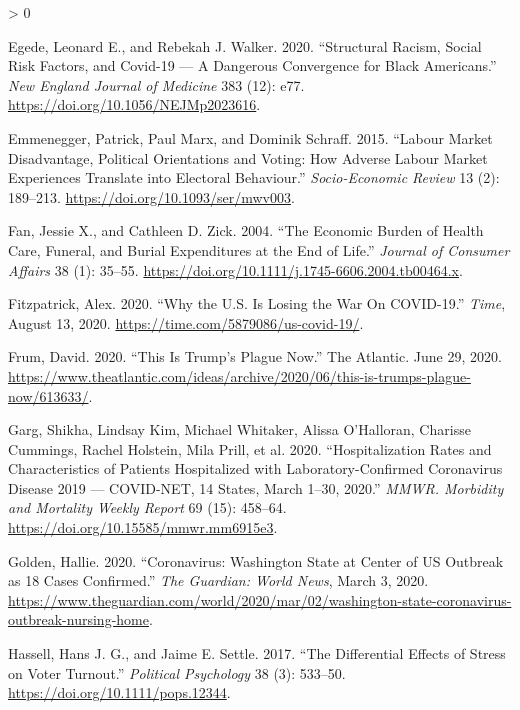 \documentclass[
  12pt,
]{article}
\newlength{\cslhangindent}
\newenvironment{CSLReferences}[2] %
 {%
  \setlength{\parindent}{0pt}
  \ifodd #1 \everypar{\setlength{\hangindent}{\cslhangindent}}\ignorespaces\fi
  \ifnum #2 > 0
  \setlength{\parskip}{#2\baselineskip}
  \fi
 }%
 {}
\begin{document}
\begin{CSLReferences}{1}{0}
\leavevmode\hypertarget{ref-Egede2020}{}%
Egede, Leonard E., and Rebekah J. Walker. 2020. {``Structural {Racism}, {Social Risk Factors}, and {Covid}-19 --- {A Dangerous Convergence} for {Black Americans}.''} \emph{New England Journal of Medicine} 383 (12): e77. \url{https://doi.org/10.1056/NEJMp2023616}.

\leavevmode\hypertarget{ref-Emmenegger2015}{}%
Emmenegger, Patrick, Paul Marx, and Dominik Schraff. 2015. {``Labour Market Disadvantage, Political Orientations and Voting: How Adverse Labour Market Experiences Translate into Electoral Behaviour.''} \emph{Socio-Economic Review} 13 (2): 189--213. \url{https://doi.org/10.1093/ser/mwv003}.

\leavevmode\hypertarget{ref-Fan2004}{}%
Fan, Jessie X., and Cathleen D. Zick. 2004. {``The {Economic Burden} of {Health Care}, {Funeral}, and {Burial Expenditures} at the {End} of {Life}.''} \emph{Journal of Consumer Affairs} 38 (1): 35--55. \url{https://doi.org/10.1111/j.1745-6606.2004.tb00464.x}.

\leavevmode\hypertarget{ref-Fitzpatrick2020}{}%
Fitzpatrick, Alex. 2020. {``Why the {U}.{S}. {Is Losing} the {War On COVID}-19.''} \emph{Time}, August 13, 2020. \url{https://time.com/5879086/us-covid-19/}.

\leavevmode\hypertarget{ref-Frum2020}{}%
Frum, David. 2020. {``This {Is Trump}'s {Plague Now}.''} {The Atlantic}. June 29, 2020. \url{https://www.theatlantic.com/ideas/archive/2020/06/this-is-trumps-plague-now/613633/}.

\leavevmode\hypertarget{ref-Garg2020}{}%
Garg, Shikha, Lindsay Kim, Michael Whitaker, Alissa O'Halloran, Charisse Cummings, Rachel Holstein, Mila Prill, et al. 2020. {``Hospitalization {Rates} and {Characteristics} of {Patients Hospitalized} with {Laboratory}-{Confirmed Coronavirus Disease} 2019 --- {COVID}-{NET}, 14 {States}, {March} 1--30, 2020.''} \emph{MMWR. Morbidity and Mortality Weekly Report} 69 (15): 458--64. \url{https://doi.org/10.15585/mmwr.mm6915e3}.

\leavevmode\hypertarget{ref-Golden2020}{}%
Golden, Hallie. 2020. {``Coronavirus: {Washington} State at Center of {US} Outbreak as 18 Cases Confirmed.''} \emph{The Guardian: World News}, March 3, 2020. \url{https://www.theguardian.com/world/2020/mar/02/washington-state-coronavirus-outbreak-nursing-home}.

\leavevmode\hypertarget{ref-Hassell2017}{}%
Hassell, Hans J. G., and Jaime E. Settle. 2017. {``The {Differential Effects} of {Stress} on {Voter Turnout}.''} \emph{Political Psychology} 38 (3): 533--50. \url{https://doi.org/10.1111/pops.12344}.


\end{CSLReferences}
\end{document}
